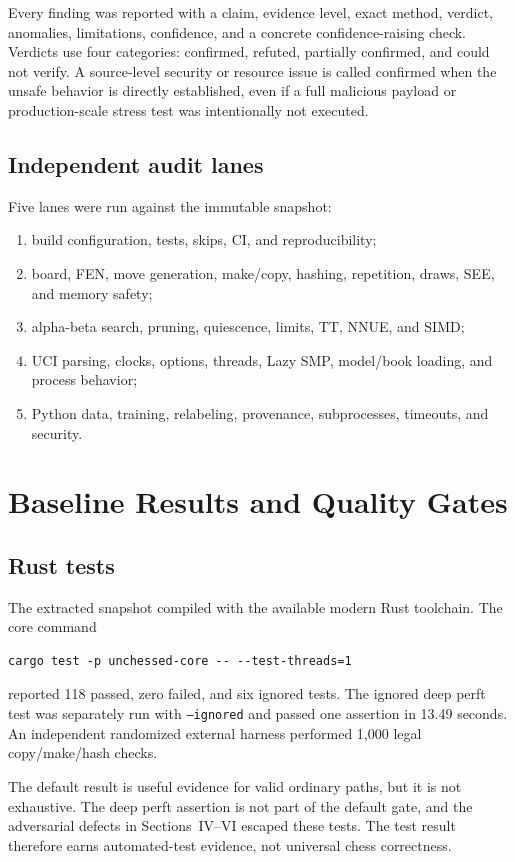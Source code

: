 \documentclass[conference]{IEEEtran}
\newcommand{\code}[1]{\texttt{\small #1}}
\begin{document}
Every finding was reported with a claim, evidence level, exact method, verdict, anomalies, limitations, confidence, and a concrete confidence-raising check. Verdicts use four categories: confirmed, refuted, partially confirmed, and could not verify. A source-level security or resource issue is called confirmed when the unsafe behavior is directly established, even if a full malicious payload or production-scale stress test was intentionally not executed.

\subsection{Independent audit lanes}
Five lanes were run against the immutable snapshot:
\begin{enumerate}[leftmargin=*]
\item build configuration, tests, skips, CI, and reproducibility;
\item board, FEN, move generation, make/copy, hashing, repetition, draws, SEE, and memory safety;
\item alpha-beta search, pruning, quiescence, limits, TT, NNUE, and SIMD;
\item UCI parsing, clocks, options, threads, Lazy SMP, model/book loading, and process behavior;
\item Python data, training, relabeling, provenance, subprocesses, timeouts, and security.
\end{enumerate}

\section{Baseline Results and Quality Gates}
\subsection{Rust tests}
The extracted snapshot compiled with the available modern Rust toolchain. The core command
\begin{verbatim}
cargo test -p unchessed-core -- --test-threads=1
\end{verbatim}
reported 118 passed, zero failed, and six ignored tests. The ignored deep perft test was separately run with \code{--ignored} and passed one assertion in 13.49 seconds. An independent randomized external harness performed 1,000 legal copy/make/hash checks.

The default result is useful evidence for valid ordinary paths, but it is not exhaustive. The deep perft assertion is not part of the default gate, and the adversarial defects in Sections~IV--VI escaped these tests. The test result therefore earns automated-test evidence, not universal chess correctness.
\end{document}
